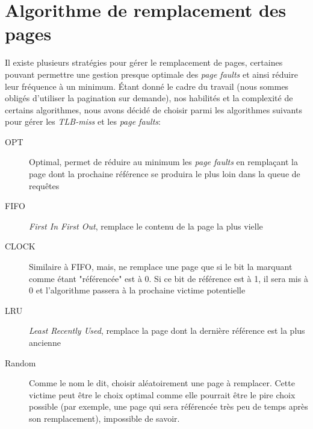 \documentclass{article}
\begin{document}
\section{Algorithme de remplacement des pages}
\setlength{\parindent}{20pt}
Il existe plusieurs stratégies pour gérer le remplacement de pages, certaines pouvant permettre une gestion presque optimale des 
\emph{page faults} et ainsi réduire leur fréquence à un minimum. Étant donné le cadre du travail (nous sommes obligés d'utiliser la pagination 
sur demande), nos habilités et la complexité de certains algorithmes, nous avons décidé de choisir parmi les algorithmes suivants pour gérer les 
\emph{TLB-miss} et les \emph{page faults}:\\
\begin{description}
    \item [OPT] Optimal, permet de réduire au minimum les \emph{page faults} en remplaçant la page dont la prochaine référence se produira le 
    plus loin dans la queue de requêtes
    \item [FIFO] \emph{First In First Out}, remplace le contenu de la page la plus vielle
    \item [CLOCK] Similaire à FIFO, mais, ne remplace une page que si le bit la marquant comme étant "référencée" est à 0. Si ce bit de référence 
    est à 1, il sera mis à 0 et l'algorithme passera à la prochaine victime potentielle
    \item [LRU] \emph{Least Recently Used}, remplace la page dont la dernière référence est la plus ancienne
    \item [Random] Comme le nom le dit, choisir aléatoirement une page à remplacer. Cette victime peut être le choix optimal comme elle pourrait 
    être le pire choix possible (par exemple, une page qui sera référencée très peu de temps après son remplacement), impossible de savoir.
\end{description}
\end{document}
